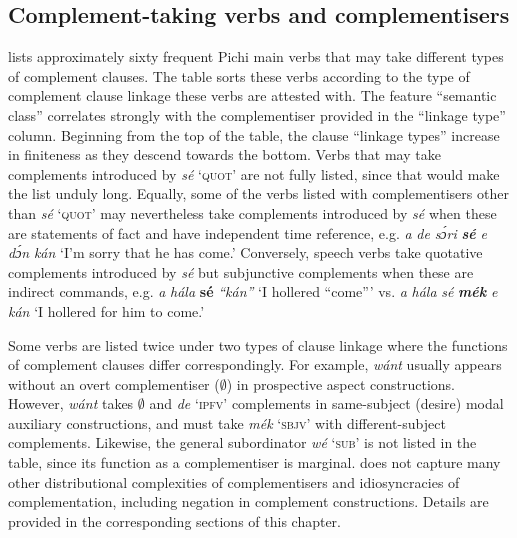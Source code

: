 \subsection{Complement-taking verbs and complementisers}
 lists approximately sixty frequent Pichi main verbs that may take different types of complement clauses. The table sorts these verbs according to the type of complement clause linkage these verbs are attested with. The feature “semantic class” correlates strongly with the complementiser provided in the “linkage type” column. Beginning from the top of the table, the clause “linkage types” increase in finiteness as they descend towards the bottom. Verbs that may take complements introduced by \textit{sé} ‘\textsc{quot}’ are not fully listed, since that would make the list unduly long. Equally, some of the verbs listed with complementisers other than \textit{sé} ‘\textsc{quot’} may nevertheless take complements introduced by \textit{sé} when these are statements of fact and have independent time reference, e.g. \textit{a} \textit{de} \textit{sɔ́ri} \textbf{\textit{sé}} \textit{e} \textit{dɔ́n} \textit{kán} ‘I’m sorry that he has come.’ Conversely, speech verbs take quotative complements introduced by \textit{sé} but subjunctive complements when these are indirect commands, e.g. \textit{a} \textit{hála}\textbf{ \textbf{sé}} \textit{“kán”} ‘I hollered “come”’ vs. \textit{a} \textit{hála} \textit{sé} \textbf{\textit{mék}} \textit{e} \textit{kán} ‘I hollered for him to come.’


Some verbs are listed twice under two types of clause linkage where the functions of complement clauses differ correspondingly. For example, \textit{wánt} usually appears without an overt complementiser (${\emptyset}$) in prospective aspect constructions. However, \textit{wánt} takes ${\emptyset}$ and \textit{de} \textsc{‘ipfv’} complements in same-subject (desire) modal auxiliary constructions, and must take \textit{mék} \textsc{‘sbjv’} with different-subject complements. Likewise, the general subordinator \textit{wé} \textsc{‘sub’} is not listed in the table, since its function as a complementiser is marginal.  does not capture many other distributional complexities of complementisers and idiosyncracies of complementation, including negation in complement constructions. Details are provided in the corresponding sections of this chapter. 


